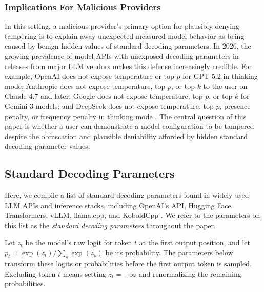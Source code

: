 \documentclass{article}
\begin{document}
\subsubsection{Implications For Malicious Providers}

In this setting, a malicious provider's primary option for plausibly denying tampering is to explain away unexpected measured model behavior as being caused by benign hidden values of standard decoding parameters. In 2026, the growing prevalence
of model APIs with unexposed decoding parameters in releases from
major LLM vendors makes this defense increasingly credible.
For example,
OpenAI does not expose temperature or top-$p$ for GPT-5.2 in thinking mode;
Anthropic does not expose temperature, top-$p$, or top-$k$ to the user on Claude
4.7 and later; Google does not expose temperature, top-$p$, or top-$k$ for
Gemini 3 models; and DeepSeek does not expose
temperature, top-$p$, presence penalty, or frequency penalty in thinking mode
\citep{openai_gpt52_parameters,anthropic_messages_api,
google_gemini_inference,deepseek_thinking_mode}. The central question of this paper is whether a user can demonstrate a model configuration to be tampered despite the obfuscation and plausible deniability afforded by hidden standard decoding parameter values.


\subsection{Standard Decoding Parameters}
\label{sec:standard-decoding-parameters}

Here, we compile a list of standard decoding parameters found in widely-used LLM
APIs and inference stacks, including OpenAI's API, Hugging Face Transformers,
vLLM, llama.cpp, and KoboldCpp
\citep{openai_chat_sampling,huggingface_generation,vllm_sampling_params,llamacpp_server,
koboldcpp_samplers}. We refer to the parameters on this list as the
\emph{standard decoding parameters} throughout the paper.

Let $z_t$ be the model's raw logit for token $t$ at the first output position,
and let $p_t=\exp(z_t)/\sum_s\exp(z_s)$ be its probability. The parameters below
transform these logits or probabilities before the first output token is
sampled. Excluding token $t$ means setting $z_t=-\infty$ and renormalizing the
remaining probabilities.
\end{document}
